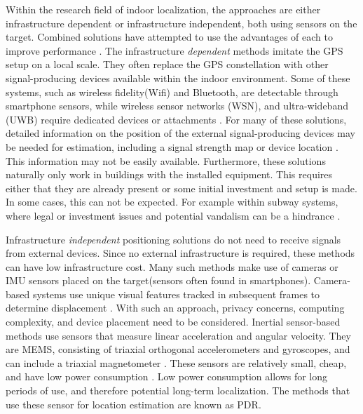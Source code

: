 Within the research field of indoor localization, the approaches are either infrastructure dependent or infrastructure independent, both using sensors on the target. Combined solutions have attempted to use the advantages of each to improve performance \cite{Gu2019, Correa2017}. The infrastructure \textit{dependent} methods imitate the GPS setup on a local scale. They often replace the GPS constellation with other signal-producing devices available within the indoor environment. Some of these systems, such as wireless fidelity(Wifi) and Bluetooth, are detectable through smartphone sensors, while wireless sensor networks (WSN), and ultra-wideband (UWB) require dedicated devices or attachments \cite{Wu2019,Jackermeier2018,Davidson2017}. For many of these solutions, detailed information on the position of the external signal-producing devices may be needed for estimation, including a signal strength map or device location \cite{Jackermeier2018,Shang2015}. This information may not be easily available. Furthermore, these solutions naturally only work in buildings with the installed equipment. This requires either that they are already present or some initial investment and setup is made. In some cases, this can not be expected. For example within subway systems, where legal or investment issues and potential vandalism can be a hindrance \cite{Torok2014}. \par
%

Infrastructure \textit{independent} positioning solutions do not need to receive signals from external devices. Since no external infrastructure is required, these methods can have low infrastructure cost. Many such methods make use of cameras or \ac{IMU} sensors placed on the target(sensors often found in smartphones). Camera-based systems use unique visual features tracked in subsequent frames to determine displacement \cite{Gu2019}. With such an approach, privacy concerns, computing complexity, and device placement need to be considered. Inertial sensor-based methods use sensors that measure linear acceleration and angular velocity. They are \ac{MEMS},  consisting of triaxial orthogonal accelerometers and gyroscopes, and can include a triaxial magnetometer \cite{Yang2014}. These sensors are relatively small, cheap, and have low power consumption \cite{Olsson2016}. Low power consumption allows for long periods of use, and therefore potential long-term localization. The methods that use these sensor for location estimation are known as \ac{PDR}. \par

